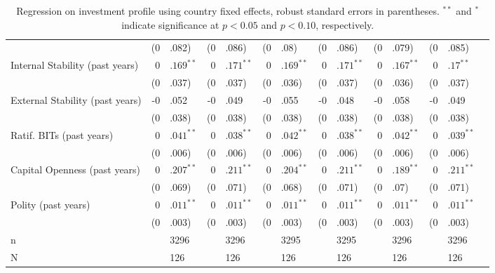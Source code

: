 \begin{enumerate}
\begin{itemize}
\begin{table}[ht]
\begin{tabular}{lr@{} lr@{}lr@{}lr@{} lr@{}lr@{}lr@{}}
			   & (0&.082) & (0&.086) & (0&.08) & (0&.086) & (0&.079) & (0&.085) \\ 
			  Internal Stability (past  years) & $0$&$.169^{\ast\ast}$ & $0$&$.171^{\ast\ast}$ & $0$&$.169^{\ast\ast}$ & $0$&$.171^{\ast\ast}$ & $0$&$.167^{\ast\ast}$ & $0$&$.17^{\ast\ast}$ \\ 
			   & (0&.037) & (0&.037) & (0&.036) & (0&.037) & (0&.036) & (0&.037) \\ 
			  External Stability (past  years) & -0&.052 & -0&.049 & -0&.055 & -0&.048 & -0&.058 & -0&.049 \\ 
			   & (0&.038) & (0&.038) & (0&.038) & (0&.038) & (0&.038) & (0&.038) \\ 
			  Ratif. BITs (past  years) & $0$&$.041^{\ast\ast}$ & $0$&$.038^{\ast\ast}$ & $0$&$.042^{\ast\ast}$ & $0$&$.038^{\ast\ast}$ & $0$&$.042^{\ast\ast}$ & $0$&$.039^{\ast\ast}$ \\ 
			   & (0&.006) & (0&.006) & (0&.006) & (0&.006) & (0&.006) & (0&.006) \\ 
			  Capital Openness (past  years) & $0$&$.207^{\ast\ast}$ & $0$&$.211^{\ast\ast}$ & $0$&$.204^{\ast\ast}$ & $0$&$.211^{\ast\ast}$ & $0$&$.189^{\ast\ast}$ & $0$&$.211^{\ast\ast}$ \\ 
			   & (0&.069) & (0&.071) & (0&.068) & (0&.071) & (0&.07) & (0&.071) \\ 
			  Polity (past  years) & $0$&$.011^{\ast\ast}$ & $0$&$.011^{\ast\ast}$ & $0$&$.011^{\ast\ast}$ & $0$&$.011^{\ast\ast}$ & $0$&$.011^{\ast\ast}$ & $0$&$.011^{\ast\ast}$ \\ 
			   & (0&.003) & (0&.003) & (0&.003) & (0&.003) & (0&.003) & (0&.003) \\ 
			   \hline
			n && 3296 && 3296 && 3295 && 3295 && 3296 && 3296 \\ 
			  N && 126 && 126 && 126 && 126 && 126 && 126 \\ 
			   \hline
			\hline
			\end{tabular}
			\endgroup
			\caption{Regression on investment profile using country fixed effects, robust standard errors in parentheses. $^{**}$ and $^{*}$ indicate significance at $p< 0.05 $ and $p< 0.10 $, respectively.} 
			\end{table}
			\FloatBarrier


\end{itemize}
\end{enumerate}
